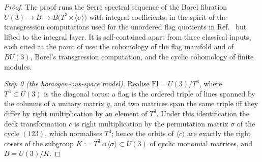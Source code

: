 \documentclass[11pt,a4paper]{article}
\begin{document}
\begin{proof}
The proof runs the Serre spectral sequence of the Borel fibration
$U(3)\to B\to B\bigl(T^3\rtimes\langle\sigma\rangle\bigr)$ with integral
coefficients, in the spirit of the transgression computations used for the
unordered flag quotients in Ref.~\cite{GuerraJana2025} but lifted to the
integral layer. It is self-contained apart from three classical inputs,
each cited at the point of use: the cohomology of the flag manifold and of
$BU(3)$, Borel's transgression computation, and the cyclic cohomology of
finite modules.

\emph{Step 0 (the homogeneous-space model).} Realise
$\mathrm{Fl}=U(3)/T^3$, where $T^3\subset U(3)$ is the diagonal torus: a
flag is the ordered triple of lines spanned by the columns of a unitary
matrix $g$, and two matrices span the same triple iff they differ by right
multiplication by an element of $T^3$. Under this identification the deck
transformation $c$ is right multiplication by the permutation matrix
$\sigma$ of the cycle $(123)$, which normalises $T^3$; hence the orbits of
$\langle c\rangle$ are exactly the right cosets of the subgroup
$K:=T^3\rtimes\langle\sigma\rangle\subset U(3)$ of cyclic monomial
matrices, and $B=U(3)/K$.


\end{proof}
\end{document}
